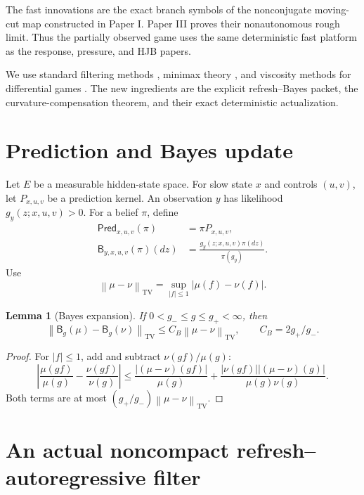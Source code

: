 \documentclass[11pt,reqno]{amsart}
\newtheorem{lemma}[theorem]{Lemma}
\theoremstyle{definition}
\theoremstyle{remark}
\newcommand{\TV}{\mathrm{TV}}
\newcommand{\norm}[1]{\left\lVert #1\right\rVert}
\newcommand{\abs}[1]{\left\lvert #1\right\rvert}
\begin{document}
The fast innovations are the exact branch symbols of the nonconjugate
moving-cut map constructed in Paper I.  Paper III proves their nonautonomous
rough limit.  Thus the partially observed game uses the same deterministic
fast platform as the response, pressure, and HJB papers.

We use standard filtering methods \cite{BainCrisan2009,AtarZeitouni1997,
vanHandel2009}, minimax theory \cite{Sion1958}, and viscosity methods for
differential games \cite{FlemingSouganidis1989,FlemingSoner2006,
BuckdahnLi2008}.  The new ingredients are the explicit refresh--Bayes packet,
the curvature-compensation theorem, and their exact deterministic
actualization.

\section{Prediction and Bayes update}\label{sec:filter}

Let $E$ be a measurable hidden-state space.  For slow state $x$ and controls
$(u,v)$, let $P_{x,u,v}$ be a prediction kernel.  An observation $y$ has
likelihood $g_y(z;x,u,v)>0$.  For a belief $\pi$, define
\begin{align}
 \mathsf{Pred}_{x,u,v}(\pi)&=\pi P_{x,u,v},\label{eq:pred}\\
 \mathsf B_{y,x,u,v}(\pi)(dz)&=
 \frac{g_y(z;x,u,v)\pi(dz)}{\pi(g_y)}.
 \label{eq:Bayes}
\end{align}
Use
\[
 \norm{\mu-\nu}_{\TV}
 =\sup_{\abs f\le1}\abs{\mu(f)-\nu(f)}.
\]

\begin{lemma}[Bayes expansion]\label{lem:Bayes}
If $0<g_-\le g\le g_+<\infty$, then
\begin{equation}\label{eq:Bayes-Lip}
 \norm{\mathsf B_g(\mu)-\mathsf B_g(\nu)}_{\TV}
 \le C_B\norm{\mu-\nu}_{\TV},
 \qquad C_B=2g_+/g_-.
\end{equation}
\end{lemma}

\begin{proof}
For $\abs f\le1$, add and subtract $\nu(gf)/\mu(g)$:
\[
 \abs{\frac{\mu(gf)}{\mu(g)}-
       \frac{\nu(gf)}{\nu(g)}}
 \le\frac{\abs{(\mu-\nu)(gf)}}{\mu(g)}
 +\frac{\abs{\nu(gf)}\abs{(\mu-\nu)(g)}}
       {\mu(g)\nu(g)}.
\]
Both terms are at most $(g_+/g_-)\norm{\mu-\nu}_{\TV}$.
\end{proof}

\section{An actual noncompact refresh--autoregressive filter}\label{sec:refresh}
\end{document}
